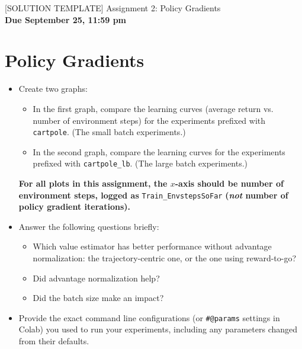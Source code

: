 \documentclass{article}
\begin{document}

\begin{centering}
    {\Large [SOLUTION TEMPLATE] Assignment 2: Policy Gradients} \\
    \vspace{.25cm}
    \textbf{Due September 25, 11:59 pm} \\
\end{centering}

\setcounter{section}{3}
\section{Policy Gradients}
\begin{itemize}
\item Create two graphs:
\begin{itemize}
\item In the first graph, compare the learning curves (average return vs. number of environment steps) for the experiments prefixed with \verb|cartpole|. (The small batch experiments.)
\item In the second graph, compare the learning curves for the experiments prefixed with \verb|cartpole_lb|. (The large batch experiments.)
\end{itemize}
\textbf{For all plots in this assignment, the $x$-axis should be number of environment steps, logged as} \verb|Train_EnvstepsSoFar| \textbf{(\textit{not} number of policy gradient iterations).}
\item Answer the following questions briefly: 
\begin{itemize}
\item Which value estimator has better performance without advantage normalization: the trajectory-centric one, or the one using reward-to-go?
\item Did advantage normalization help?
\item Did the batch size make an impact?
\end{itemize}
\item Provide the exact command line configurations (or \texttt{\#@params} settings in Colab) you used to run your experiments, including any parameters changed from their defaults.
\end{itemize}
\end{document}
